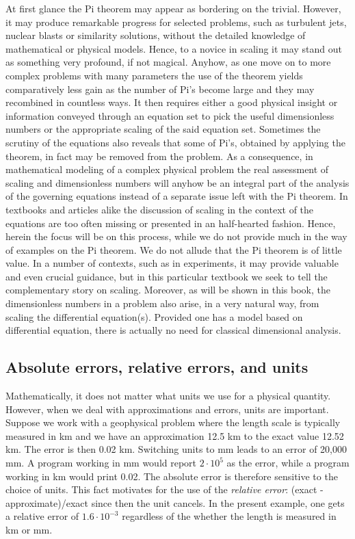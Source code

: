 \documentclass[graybox,envcountchap,sectrefs,final]{svmonodo}
\begin{document}
At first glance the Pi theorem may appear as bordering on the
trivial. However, it may produce remarkable progress for selected
problems, such as turbulent jets, nuclear blasts or similarity
solutions, without the detailed knowledge of mathematical or physical
models. Hence, to a novice in scaling it may stand out as something
very profound, if not magical.  Anyhow, as one move on to more complex
problems with many parameters the use of the theorem yields
comparatively less gain as the number of Pi's become large and they
may recombined in countless ways. It then requires either a good
physical insight or information conveyed through an equation set to
pick the useful dimensionless numbers or the appropriate scaling of
the said equation set.  Sometimes the scrutiny of the equations also
reveals that some of Pi's, obtained by applying the theorem, in fact
may be removed from the problem.  As a consequence, in mathematical
modeling of a complex physical problem the real assessment of scaling
and dimensionless numbers will anyhow be an integral part of the
analysis of the governing equations instead of a separate issue left
with the Pi theorem. In textbooks and articles alike the discussion of
scaling in the context of the equations are too often missing or
presented in an half-hearted fashion. Hence, herein the focus will be
on this process, while we do not provide much in the way of examples
on the Pi theorem.  We do not allude that the Pi theorem is of little
value.  In a number of contexts, such as in experiments, it may
provide valuable and even crucial guidance, but in this particular
textbook we seek to tell the complementary story on scaling.
Moreover, as will be shown in this book, the dimensionless numbers in
a problem also arise, in a very natural way, from scaling the
differential equation(s).  Provided one has a model based on
differential equation, there is actually no need for classical
dimensional analysis.


\subsection{Absolute errors, relative errors, and units}

Mathematically, it does not matter what units we use for a physical
quantity. However, when we deal with approximations and errors,
units are important. Suppose we work with a geophysical problem where
the length scale is typically measured in km and we have an approximation
12.5 km to the exact value 12.52 km. The error is then 0.02 km.
Switching units to mm leads to an error of 20,000 mm. A program working
in mm would report $2\cdot 10^5$ as the error, while a program working
in km would print 0.02. The absolute error is therefore sensitive to
the choice of units. This fact motivates for the use of the \emph{relative
error}: (exact - approximate)/exact since then the unit cancels.
In the present example, one gets a relative error of $1.6\cdot 10^{-3}$
regardless of the whether the length is measured in km or mm.
\end{document}
